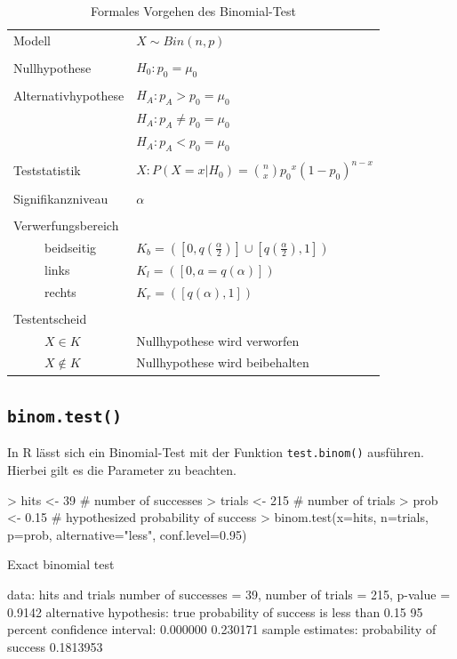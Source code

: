 \begin{table}[h!]
	\begin{tabular}{l l}
		Modell 
			& $X \sim Bin(n,p)$ \\
		& \\
		Nullhypothese
			& $H_0: p_0 = \mu_0$ \\
		& \\
		Alternativhypothese 
			& $H_A: p_A > p_0 = \mu_0$ \\
			& $H_A: p_A \neq p_0 = \mu_0$ \\ 
			& $H_A: p_A < p_0 = \mu_0$ \\
		& \\
		Teststatistik
			& $X: P(X=x|H_0) = \binom{n}{x} {p_0}^x (1-p_0)^{n-x}$ \\
		& \\
		Signifikanzniveau
			& $\alpha$ \\
		& \\
		Verwerfungsbereich
			& \\
		~~~~~beidseitig
			& $K_b = \left(\left[
					0,q\left(\frac{\alpha}{2}\right)
				\right] \cup 
				\left[
					q\left(\frac{\alpha}{2}\right),1
				\right]\right)$ \\ 
		~~~~~links
			& $K_l = \left(\left[
					0, a = q\left(\alpha
				\right)\right]\right)$ \\
		~~~~~rechts
			& $K_r = \left(\left[ 
					q\left(\alpha\right),1
				\right]\right)$ \\
		& \\
		Testentscheid
			& \\
		~~~~~$X \in K$
			& Nullhypothese wird verworfen \\
		~~~~~$X \not\in K$
			& Nullhypothese wird beibehalten \\ 
	\end{tabular}
	\caption{Formales Vorgehen des Binomial-Test}
\end{table}

\subsection{\lstinline{binom.test()}}
In R lässt sich ein Binomial-Test mit der Funktion 
\lstinline{test.binom()} ausführen. Hierbei gilt es die Parameter
zu beachten.

\begin{Schunk}
\begin{Sinput}
> hits <- 39 # number of successes
> trials <- 215 # number of trials
> prob <- 0.15 # hypothesized probability of success
> binom.test(x=hits, n=trials, p=prob, alternative="less", conf.level=0.95)
\end{Sinput}
\begin{Soutput}
	Exact binomial test

data:  hits and trials
number of successes = 39, number of trials = 215, p-value = 0.9142
alternative hypothesis: true probability of success is less than 0.15
95 percent confidence interval:
 0.000000 0.230171
sample estimates:
probability of success 
             0.1813953 
\end{Soutput}
\end{Schunk}

